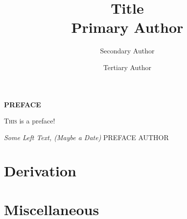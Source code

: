 \documentclass[titlepage]{book}
\title{\textbf{\huge{Title}\\\Large{Primary Author}}}
\author{
    Secondary Author
    \and
    Tertiary Author
}
\date{}
\newcommand{\firstword}[2]{
    \lettrine[lines=3,nindent=0em,findent=0.5em,realheight]{#1}{#2}
}
\begin{document}

\maketitle


\begin{center}
    \textbf{\Large{PREFACE}}
\end{center}

\firstword{T}{his} is a preface! \lipsum[1]

\vspace{\baselineskip}

\textit{Some Left Text, (Maybe a Date)} \hfill PREFACE AUTHOR


\pagestyle{empty}
    \renewcommand{\baselinestretch}{0.94}\normalsize
            \tableofcontents
    \renewcommand{\baselinestretch}{1.0}\normalsize
\restoregeometry
\pagestyle{fancy}

\clearpage



\section{Derivation}





\section{Miscellaneous}


% 
\end{document}
